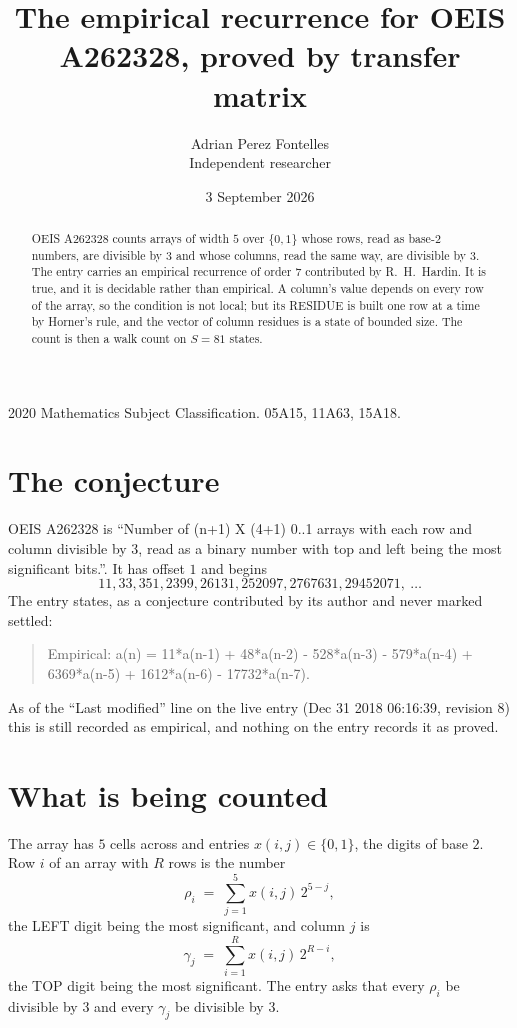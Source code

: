 \documentclass[11pt,a4paper]{article}
\title{The empirical recurrence for OEIS A262328, proved by transfer matrix}
\author{Adrian Perez Fontelles\\ \small Independent researcher}
\date{3 September 2026}
\theoremstyle{plain}
\theoremstyle{definition}
\begin{document}
\maketitle

\begin{abstract}
OEIS A262328 counts arrays of width $5$ over $\{0,1\}$ whose rows, read as base-$2$
numbers, are divisible by $3$ and whose columns, read the same way, are divisible by
$3$. The entry carries an empirical recurrence of order $7$ contributed by
R.~H.~Hardin. It is true, and it is decidable rather than empirical. A column's value depends on
every row of the array, so the condition is not local; but its RESIDUE is built one row at a
time by Horner's rule, and the vector of column residues is a state of bounded size. The count
is then a walk count on $S=81$ states.
\end{abstract}

\noindent\small 2020 Mathematics Subject Classification. 05A15, 11A63, 15A18.\normalsize

\section{The conjecture}

OEIS A262328 is ``Number of (n+1) X (4+1) 0..1 arrays with each row and column divisible by 3, read as a binary number with top and left being the most significant bits.''. It has offset $1$ and begins
\[
11, 33, 351, 2399, 26131, 252097, 2767631, 29452071,\ \dots
\]
The entry states, as a conjecture contributed by its author and never marked settled:
\begin{quote}
Empirical: a(n) = 11*a(n-1) + 48*a(n-2) - 528*a(n-3) - 579*a(n-4) + 6369*a(n-5) + 1612*a(n-6) - 17732*a(n-7).
\end{quote}
As of the ``Last modified'' line on the live entry (Dec 31 2018 06:16:39, revision 8) this is still
recorded as empirical, and nothing on the entry records it as proved.

\section{What is being counted}

The array has $5$ cells across and entries $x(i,j)\in\{0,1\}$, the digits of
base $2$. Row $i$ of an array with $R$ rows is the number
\[
\rho_i\;=\;\sum_{j=1}^{5}x(i,j)\,2^{5-j} ,
\]
the LEFT digit being the most significant, and column $j$ is
\[
\gamma_j\;=\;\sum_{i=1}^{R}x(i,j)\,2^{R-i} ,
\]
the TOP digit being the most significant. The entry asks that every $\rho_i$ be divisible by
$3$ and every $\gamma_j$ be divisible by $3$.
\end{document}
